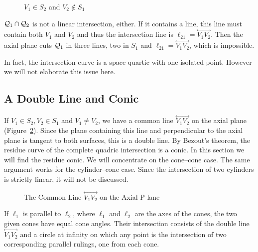\begin{figure}
\vspace{3.5cm}
\caption{$V_1\in S_2$ and $V_2\not\in S_1$}
\label{fig:vtx-on-pair}
\end{figure}

${\cal Q}_1\cap{\cal Q}_2$ is not a linear intersection, either.
If it contains a line, this line must contain both $V_1$ and $V_2$ and thus
the intersection line is $\ell_{21}=\stackrel{\longleftrightarrow}{V_1V_2}$.
Then the axial plane cuts ${\cal Q}_1$ in three lines, two in $S_1$ and
$\ell_{21}=\stackrel{\longleftrightarrow}{V_1V_2}$, which is impossible.
\QED

     In fact, the intersection curve is a space quartic with one isolated
point.  However we will not elaborate this issue here.



\subsection{A Double Line and Conic}
\label{section:common-line}

     If $V_1\in S_2, V_2\in S_1$ and $V_1\neq V_2$, we have
a common line $\stackrel{\longleftrightarrow}{V_1V_2}$ on the axial plane
(Figure~\ref{fig:v1v2}).
Since the plane containing this line and perpendicular to the axial plane is
tangent to both surfaces, this  is a double line.  By Bezout's theorem, the
residue curve of the complete quadric intersection is a conic.
In this section we
will find the residue conic.  We will concentrate on the cone--cone case.
The same argument works for the cylinder--cone case.  Since the
intersection of two cylinders is strictly linear, it will not be discussed.
\begin{figure}
\vspace{6.5cm}
\caption{The Common Line $\stackrel{\longleftrightarrow}{V_1V_2}$ on the Axial P
lane}
\label{fig:v1v2}
\end{figure}

If $\ell_1$ is parallel to $\ell_2$,
where $\ell_1$ and $\ell_2$ are the axes of the cones,
the two given cones have equal cone angles.
Their intersection consists of the double line
$\stackrel{\longleftrightarrow}{V_1V_2}$ and a circle at infinity on which
any point is the intersection of two corresponding parallel rulings, one from
each cone.

